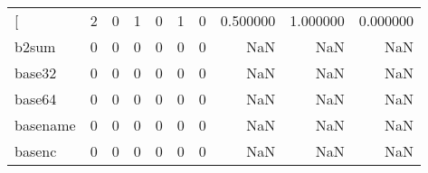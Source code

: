 \begin{longtable}{lrrrrrrrrr}
\bottomrule
\endlastfoot
{[}         &                                                  2 &                                                  0 &                                                  1 &                                                  0 &                                                  1 &                                                  0 &                                           0.500000 &                               1.000000 &                             0.000000 \\
b2sum     &                                                  0 &                                                  0 &                                                  0 &                                                  0 &                                                  0 &                                                  0 &                                                NaN &                                    NaN &                                  NaN \\
base32    &                                                  0 &                                                  0 &                                                  0 &                                                  0 &                                                  0 &                                                  0 &                                                NaN &                                    NaN &                                  NaN \\
base64    &                                                  0 &                                                  0 &                                                  0 &                                                  0 &                                                  0 &                                                  0 &                                                NaN &                                    NaN &                                  NaN \\
basename  &                                                  0 &                                                  0 &                                                  0 &                                                  0 &                                                  0 &                                                  0 &                                                NaN &                                    NaN &                                  NaN \\
basenc    &                                                  0 &                                                  0 &                                                  0 &                                                  0 &                                                  0 &                                                  0 &                                                NaN &                                    NaN &                                  NaN \\

\end{longtable}
